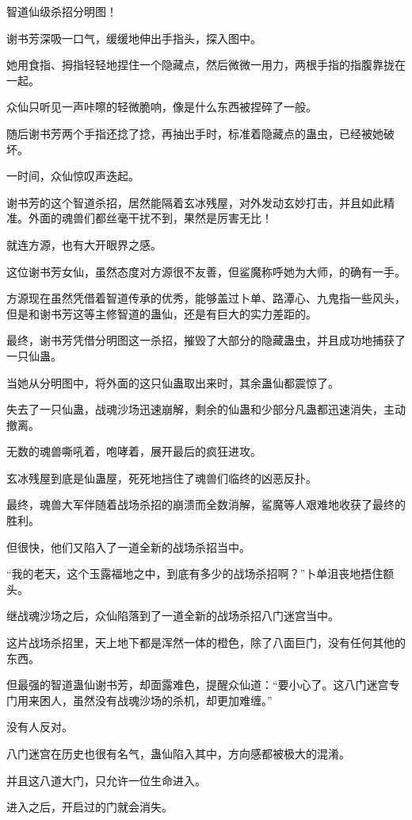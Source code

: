 \begin{this_body}
智道仙级杀招分明图！

谢书芳深吸一口气，缓缓地伸出手指头，探入图中。

她用食指、拇指轻轻地捏住一个隐藏点，然后微微一用力，两根手指的指腹靠拢在一起。

众仙只听见一声咔嚓的轻微脆响，像是什么东西被捏碎了一般。

随后谢书芳两个手指还捻了捻，再抽出手时，标准着隐藏点的蛊虫，已经被她破坏。

一时间，众仙惊叹声迭起。

谢书芳的这个智道杀招，居然能隔着玄冰残屋，对外发动玄妙打击，并且如此精准。外面的魂兽们都丝毫干扰不到，果然是厉害无比！

就连方源，也有大开眼界之感。

这位谢书芳女仙，虽然态度对方源很不友善，但鲨魔称呼她为大师，的确有一手。

方源现在虽然凭借着智道传承的优秀，能够盖过卜单、路潭心、九鬼指一些风头，但是和谢书芳这等主修智道的蛊仙，还是有巨大的实力差距的。

最终，谢书芳凭借分明图这一杀招，摧毁了大部分的隐藏蛊虫，并且成功地捕获了一只仙蛊。

当她从分明图中，将外面的这只仙蛊取出来时，其余蛊仙都震惊了。

失去了一只仙蛊，战魂沙场迅速崩解，剩余的仙蛊和少部分凡蛊都迅速消失，主动撤离。

无数的魂兽嘶吼着，咆哮着，展开最后的疯狂进攻。

玄冰残屋到底是仙蛊屋，死死地挡住了魂兽们临终的凶恶反扑。

最终，魂兽大军伴随着战场杀招的崩溃而全数消解，鲨魔等人艰难地收获了最终的胜利。

但很快，他们又陷入了一道全新的战场杀招当中。

“我的老天，这个玉露福地之中，到底有多少的战场杀招啊？”卜单沮丧地捂住额头。

继战魂沙场之后，众仙陷落到了一道全新的战场杀招八门迷宫当中。

这片战场杀招里，天上地下都是浑然一体的橙色，除了八面巨门，没有任何其他的东西。

但最强的智道蛊仙谢书芳，却面露难色，提醒众仙道：“要小心了。这八门迷宫专门用来困人，虽然没有战魂沙场的杀机，却更加难缠。”

没有人反对。

八门迷宫在历史也很有名气，蛊仙陷入其中，方向感都被极大的混淆。

并且这八道大门，只允许一位生命进入。

进入之后，开启过的门就会消失。


\end{this_body}

